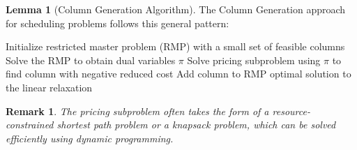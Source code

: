 \documentclass{article}
\newtheorem{remark}{Remark}
\theoremstyle{definition}
\newtheorem{lemma}{Lemma}
\begin{document}
\begin{lemma}[Column Generation Algorithm]
The Column Generation approach for scheduling problems follows this general pattern:

\begin{algorithm}
\caption{Column Generation for Scheduling}
\begin{algorithmic}[1]
    \State Initialize restricted master problem (RMP) with a small set of feasible columns
    \Repeat
        \State Solve the RMP to obtain dual variables $\pi$
            \State Solve pricing subproblem using $\pi$ to find column with negative reduced cost
                \State Add column to RMP
            \EndIf
        \EndFor
    \State \Return optimal solution to the linear relaxation
\EndProcedure
\end{algorithmic}
\end{algorithm}

\begin{remark}
The pricing subproblem often takes the form of a resource-constrained shortest path problem or a knapsack problem, which can be solved efficiently using dynamic programming.
\end{remark}
\end{lemma}
\end{document}
